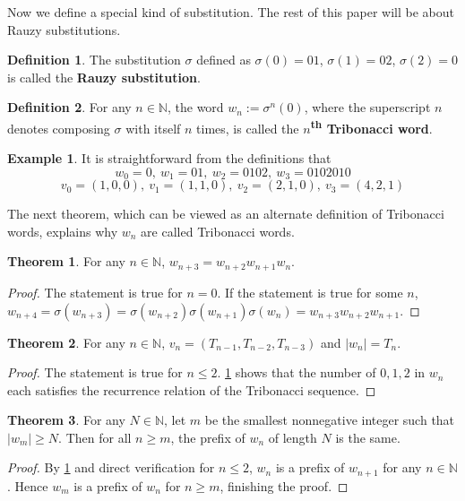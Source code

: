\documentclass{article}
\theoremstyle{definition}
\newtheorem{theorem}{Theorem}
\newtheorem*{definition}{Definition}
\newtheorem*{example}{Example}
\begin{document}
Now we define a special kind of substitution. The rest of this paper will be about Rauzy substitutions.

\begin{definition}
The substitution $\sigma$ defined as $\sigma(0)=01$, $\sigma(1)=02$, $\sigma(2)=0$ is called the \textbf{Rauzy substitution}.
\end{definition}

\begin{definition}
For any $n\in \mathbb{N}$, the word $w_n:=\sigma^n(0)$, where the superscript $n$ denotes composing $\sigma$ with itself $n$ times, is called the \textbf{$n$\textsuperscript{th} Tribonacci word}. 
\end{definition}
\begin{example}
It is straightforward from the definitions that
\[ w_0=0,  \ w_1=01,\ w_2=0102, \ w_3=0102010\]
\[ v_0=(1, 0, 0),  \ v_1=(1, 1, 0),\ v_2=(2, 1, 0), \ v_3=(4, 2, 1)\]
\end{example}

The next theorem, which can be viewed as an alternate definition of Tribonacci words, explains why $w_n$ are called Tribonacci words.

\begin{theorem}
\label{thm 3}
For any $n\in \mathbb{N}$, $w_{n+3}=w_{n+2}w_{n+1}w_n$.
\end{theorem}
\begin{proof}
The statement is true for $n=0$. If the statement is true for some $n$, $w_{n+4}=\sigma(w_{n+3})=\sigma(w_{n+2})\sigma(w_{n+1})\sigma(w_{n})=w_{n+3}w_{n+2}w_{n+1}$.
\end{proof}

\begin{theorem}
\label{thm 3-1}
For any $n\in \mathbb{N}$, $v_n=( T_{n-1}, T_{n-2}, T_{n-3})$ and $|w_n|=T_n$.
\end{theorem}
\begin{proof}
The statement is true for $n\leq2$. \cref{thm 3} shows that the number of $0, 1, 2$ in $w_n$ each satisfies the recurrence relation of the Tribonacci sequence.
\end{proof}

\begin{theorem}
\label{thm 3-2}
For any $N\in \mathbb{N}$, let $m$ be the smallest nonnegative integer such that $|w_m|\geq N$. Then for all $n\geq m$, the prefix of $w_n$ of length $N$ is the same.
\end{theorem}
\begin{proof}
By \cref{thm 3} and direct verification for $n\leq2$, $w_n$ is a prefix of $w_{n+1}$ for any $n\in \mathbb{N}$. Hence $w_m$ is a prefix of $w_n$ for $n\geq m$, finishing the proof.
\end{proof}
\end{document}
